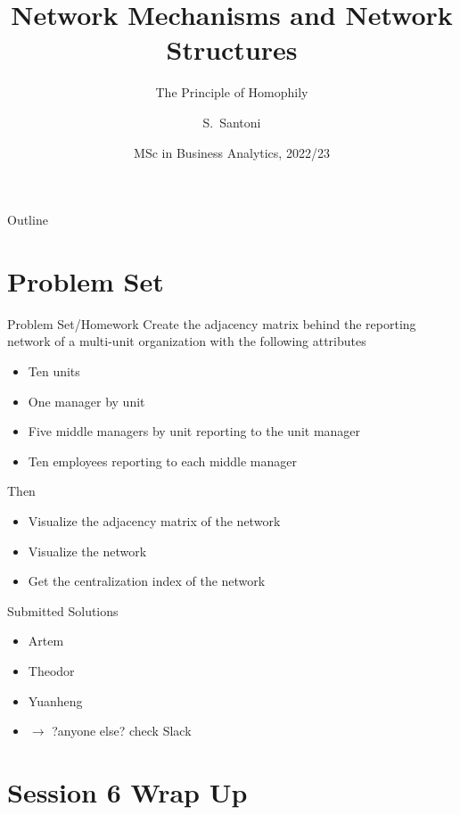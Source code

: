 \documentclass[notes, aspectratio=1610]{beamer}
\title[Network Mechanisms]
{Network Mechanisms and Network Structures}
\subtitle{The Principle of Homophily}
\author{S.~Santoni\inst{1}\inst{2}}
\institute{
	\inst{1}%
	Bayes Business School
	\and
	\inst{2}%
	Soundcloud
	}
\date{MSc in Business Analytics, 2022/23}
\begin{document}
\begin{frame}
	\titlepage
\end{frame}

\begin{frame}{Outline}
	\tableofcontents
\end{frame}

\section{Problem Set}

\begin{frame}{Problem Set/Homework}{}
	Create the adjacency matrix behind the reporting network of a 
	multi-unit organization with the following attributes
	\begin{itemize}
		\item Ten units
		\item One manager by unit
		\item Five middle managers by unit reporting to the unit manager
		\item Ten employees reporting to each middle manager 
	\end{itemize}

	Then
	\begin{itemize}
		\item 
		Visualize the adjacency matrix of the network
		\item 
		Visualize the network
		\item 
		Get the centralization index of the network
	\end{itemize}
\end{frame}

\begin{frame}{Submitted Solutions}{}
\begin{itemize}
	\item Artem
	\item Theodor
	\item Yuanheng
	\item $\rightarrow$ ?anyone else? check Slack
\end{itemize}
\end{frame}

\section{Session 6 Wrap Up}
\end{document}
